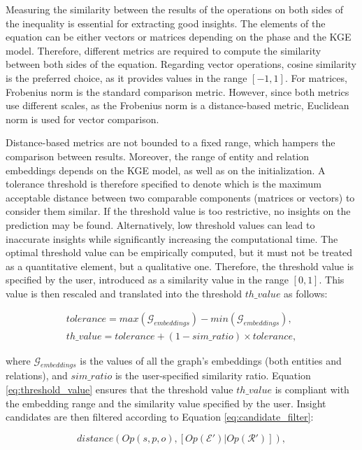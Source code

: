 Measuring the similarity between the results of the operations on both sides of the inequality is essential for extracting good insights. The elements of the equation can be either vectors or matrices depending on the phase and the KGE model. Therefore, different metrics are required to compute the similarity between both sides of the equation. Regarding vector operations, cosine similarity is the preferred choice, as it provides values in the range $[-1,1]$. For matrices, Frobenius norm is the standard comparison metric. However, since both metrics use different scales, as the Frobenius norm is a distance-based metric, Euclidean norm is used for vector comparison. 

Distance-based metrics are not bounded to a fixed range, which hampers the comparison between results. Moreover, the range of entity and relation embeddings depends on the KGE model, as well as on the initialization. A tolerance threshold is therefore specified to denote which is the maximum acceptable distance between two comparable components (matrices or vectors) to consider them similar. If the threshold value is too restrictive, no insights on the prediction may be found. Alternatively, low threshold values can lead to inaccurate insights while significantly increasing the computational time. The optimal threshold value can be empirically computed, but it must not be treated as a quantitative element, but a qualitative one. Therefore, the threshold value is specified by the user, introduced as a similarity value in the range $[0,1]$. This value is then rescaled and translated into the threshold $th\_value$ as follows:

\begin{align} 
   tolerance = max(\mathcal{G}_{embeddings})- min(\mathcal{G}_{embeddings}), \nonumber  \\
    th\_value = tolerance + ( 1 - sim\_ratio ) \times  tolerance,
\label{eq:threshold_value}
\end{align}

where $\mathcal{G}_{embeddings}$ is the values of all the graph's embeddings (both entities and relations), and $sim\_ratio$ is the user-specified similarity ratio. Equation \ref{eq:threshold_value} ensures that the threshold value $th\_value$ is compliant with the embedding range and the similarity value specified by the user. Insight candidates are then filtered according to Equation \ref{eq:candidate_filter}:

\begin{equation}\label{eq:candidate_filter}
    distance( Op(s,p,o),  [Op(\mathcal{E}') | Op(\mathcal{R}')] ),
\end{equation}

